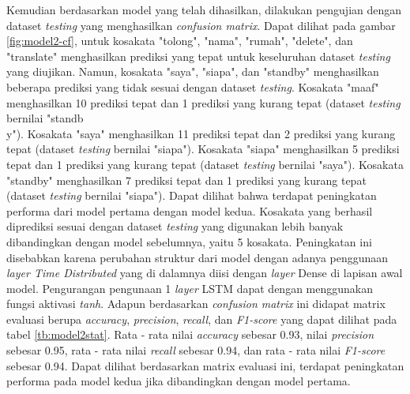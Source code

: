 Kemudian berdasarkan model yang telah dihasilkan, dilakukan pengujian dengan dataset \emph{testing} yang menghasilkan \emph{confusion matrix}. Dapat dilihat pada gambar \ref{fig:model2-cf}, untuk kosakata "tolong", "nama", "rumah", "delete", dan "translate" menghasilkan prediksi yang tepat untuk keseluruhan dataset \emph{testing} yang diujikan. Namun, kosakata "saya", "siapa", dan "standby" menghasilkan beberapa prediksi yang tidak sesuai dengan dataset \emph{testing}. Kosakata "maaf" menghasilkan 10 prediksi tepat dan 1 prediksi yang kurang tepat (dataset \emph{testing} bernilai "standb\\y"). Kosakata "saya" menghasilkan 11 prediksi tepat dan 2 prediksi yang kurang tepat (dataset \emph{testing} bernilai "siapa"). Kosakata "siapa" menghasilkan 5 prediksi tepat dan 1 prediksi yang kurang tepat (dataset \emph{testing} bernilai "saya"). Kosakata "standby" menghasilkan 7 prediksi tepat dan 1 prediksi yang kurang tepat (dataset \emph{testing} bernilai "siapa"). Dapat dilihat bahwa terdapat peningkatan performa dari model pertama dengan model kedua. Kosakata yang berhasil diprediksi sesuai dengan dataset \emph{testing} yang digunakan lebih banyak dibandingkan dengan model sebelumnya, yaitu 5 kosakata. Peningkatan ini disebabkan karena perubahan struktur dari model dengan adanya penggunaan \emph{layer Time Distributed} yang di dalamnya diisi dengan \emph{layer} Dense di lapisan awal model. Pengurangan pengunaan 1 \emph{layer} LSTM dapat dengan menggunakan fungsi aktivasi \emph{tanh}. Adapun berdasarkan \emph{confusion matrix} ini didapat matrix evaluasi berupa \emph{accuracy}, \emph{precision}, \emph{recall}, dan \emph{F1-score} yang dapat dilihat pada tabel \ref{tb:model2stat}. Rata - rata nilai \emph{accuracy} sebesar 0.93, nilai \emph{precision} sebesar 0.95, rata - rata nilai \emph{recall} sebesar 0.94, dan rata - rata nilai \emph{F1-score} sebesar 0.94. Dapat dilihat berdasarkan matrix evaluasi ini, terdapat peningkatan performa pada model kedua jika dibandingkan dengan model pertama. 


